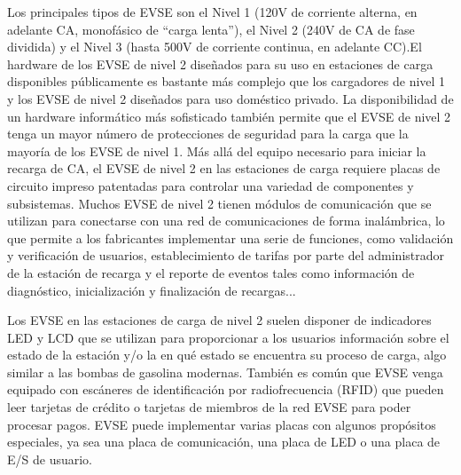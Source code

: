 \documentclass[12pt,a4paper,onecolumn,oneside]{report}
\begin{document}
Los principales tipos de EVSE son el Nivel 1 (120V de corriente alterna, en adelante CA,  monofásico de ``carga lenta”), el Nivel 2 (240V de CA de fase dividida) y el Nivel 3 (hasta 500V de corriente continua, en adelante CC).El hardware de los EVSE de nivel 2 diseñados para su uso en estaciones de carga disponibles públicamente es bastante más complejo que los cargadores de nivel 1 y los EVSE de nivel 2 diseñados para uso doméstico privado. La disponibilidad de un hardware informático más sofisticado también permite que el EVSE de nivel 2 tenga un mayor número de protecciones de seguridad para la carga que la mayoría de los EVSE de nivel 1. Más allá del equipo necesario para iniciar la recarga de CA, el EVSE de nivel 2 en las estaciones de carga requiere placas de circuito impreso patentadas para controlar una variedad de componentes y subsistemas. Muchos EVSE de nivel 2 tienen módulos de comunicación que se utilizan para conectarse con una red de comunicaciones de forma inalámbrica, lo que permite a los fabricantes implementar una serie de funciones, como validación y verificación de usuarios, establecimiento de tarifas por parte del administrador de la estación de recarga y el reporte de eventos tales como información de diagnóstico, inicialización y finalización de recargas...

Los EVSE en las estaciones de carga de nivel 2 suelen disponer de indicadores LED y LCD que se utilizan para proporcionar a los usuarios información sobre el estado de la estación y/o la en qué estado se encuentra su proceso de carga, algo similar a las bombas de gasolina modernas. También es común que EVSE venga equipado con escáneres de identificación por radiofrecuencia (RFID) que pueden leer tarjetas de crédito o tarjetas de miembros de la red EVSE para poder procesar pagos. EVSE puede implementar varias placas con algunos propósitos especiales, ya sea una placa de comunicación, una placa de LED o una placa de E/S de usuario. 
\end{document}
